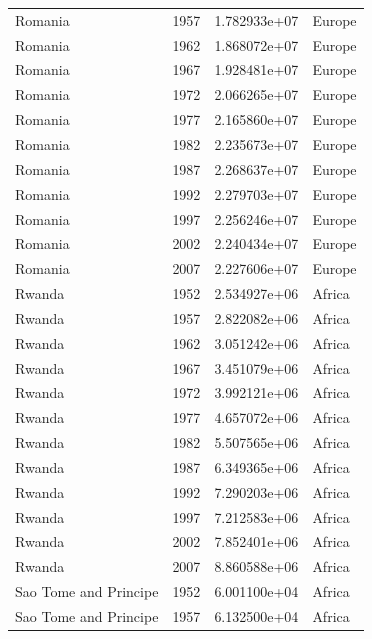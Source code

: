 \documentclass[
  letterpaper,
  DIV=11,
  numbers=noendperiod]{scrreprt}
\begin{document}
\begin{tcolorbox}
\begin{tabular}{lrrl}
Romania                  &  1957 &  1.782933e+07 &    Europe \\
Romania                  &  1962 &  1.868072e+07 &    Europe \\
Romania                  &  1967 &  1.928481e+07 &    Europe \\
Romania                  &  1972 &  2.066265e+07 &    Europe \\
Romania                  &  1977 &  2.165860e+07 &    Europe \\
Romania                  &  1982 &  2.235673e+07 &    Europe \\
Romania                  &  1987 &  2.268637e+07 &    Europe \\
Romania                  &  1992 &  2.279703e+07 &    Europe \\
Romania                  &  1997 &  2.256246e+07 &    Europe \\
Romania                  &  2002 &  2.240434e+07 &    Europe \\
Romania                  &  2007 &  2.227606e+07 &    Europe \\
Rwanda                   &  1952 &  2.534927e+06 &    Africa \\
Rwanda                   &  1957 &  2.822082e+06 &    Africa \\
Rwanda                   &  1962 &  3.051242e+06 &    Africa \\
Rwanda                   &  1967 &  3.451079e+06 &    Africa \\
Rwanda                   &  1972 &  3.992121e+06 &    Africa \\
Rwanda                   &  1977 &  4.657072e+06 &    Africa \\
Rwanda                   &  1982 &  5.507565e+06 &    Africa \\
Rwanda                   &  1987 &  6.349365e+06 &    Africa \\
Rwanda                   &  1992 &  7.290203e+06 &    Africa \\
Rwanda                   &  1997 &  7.212583e+06 &    Africa \\
Rwanda                   &  2002 &  7.852401e+06 &    Africa \\
Rwanda                   &  2007 &  8.860588e+06 &    Africa \\
Sao Tome and Principe    &  1952 &  6.001100e+04 &    Africa \\
Sao Tome and Principe    &  1957 &  6.132500e+04 &    Africa \\

\end{tabular}
\end{tcolorbox}
\end{document}
